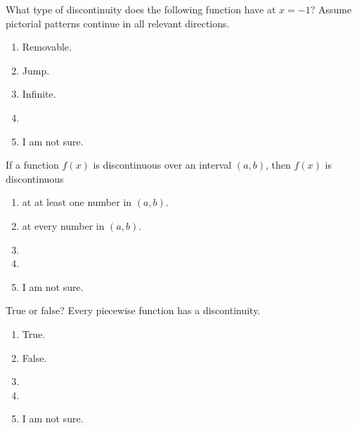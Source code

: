 \documentclass[aspectratio=169, 14pt, t]{beamer}  %
\begin{document}
\begin{poll}
  What type of discontinuity does the following function have at \(x = -1\)?  Assume pictorial patterns continue in all relevant directions.

  \begin{minipage}{2in}
    \begin{enumerate}
      \item Removable.
      \item Jump.
      \item Infinite.
      \item
      \item I am not sure.
    \end{enumerate}
  \end{minipage}
  \quad
  \begin{minipage}{3in}
  \end{minipage}
\end{poll}

\begin{poll}
  If a function \(f(x)\) is discontinuous over an interval \((a,b)\), then \(f(x)\) is discontinuous

  \begin{enumerate}
    \item at at least one number in \((a,b)\).
    \item at every number in \((a,b)\).
    \item
    \item
    \item I am not sure.
  \end{enumerate}
\end{poll}

\begin{poll}
  True or false? Every piecewise function has a discontinuity.

  \begin{enumerate}
    \item True.
    \item False.
    \item
    \item
    \item I am not sure.
  \end{enumerate}
\end{poll}
\end{document}
